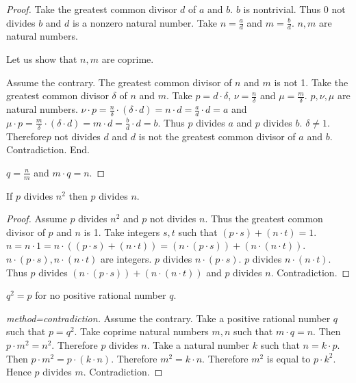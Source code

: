 \documentclass{article}
\begin{document}
\begin{forthel}
\begin{proof}
Take the greatest common divisor $d$ of $a$ and $b$. $b$ is nontrivial. Thus 0 not divides $b$ and $d$ is a nonzero natural number.
Take $n = \frac{a}{d}$ and $m = \frac{b}{d}$. $n,m$ are natural numbers.

Let us show that $n,m$ are coprime.

  Assume the contrary. The greatest common divisor of $n$ and $m$ is not 1. Take the greatest common divisor $\delta$ of $n$ and $m$.
  Take $p = d \cdot \delta$, $\nu = \frac{n}{\delta}$ and $\mu = \frac{m}{\delta}$. $p,\nu,\mu$ are natural numbers.
  $\nu \cdot p = \frac{n}{\delta} \cdot (\delta \cdot d) = n \cdot d = \frac{a}{d} \cdot d = a$ and
  $\mu \cdot p = \frac{m}{\delta} \cdot (\delta \cdot d) = m \cdot d = \frac{b}{d} \cdot d = b$.
  Thus $p$ divides $a$ and $p$ divides $b$. $\delta \neq 1$.
  Therefore$p$ not divides $d$ and $d$ is not the greatest common divisor of $a$ and $b$. Contradiction.
End.

$q = \frac{n}{m}$ and $m \cdot q = n$.
\end{proof}

    \begin{lemma}
      If $p$ divides $n^{2}$ then $p$ divides $n$.
    \end{lemma}
    \begin{proof}
      Assume $p$ divides $n^{2}$ and $p$ not divides $n$. Thus the greatest common divisor of $p$ and $n$ is 1.
      Take integers $s,t$ such that $(p \cdot s) + (n \cdot t) = 1$.
      $n = n \cdot 1 = n \cdot ((p \cdot s) + (n \cdot t)) = (n \cdot (p \cdot s)) + (n \cdot (n \cdot t))$.
      $n \cdot (p \cdot s), n \cdot (n \cdot t)$ are integers.
      $p$ divides $n \cdot (p \cdot s)$. $p$ divides $n \cdot (n \cdot t)$.
      Thus $p$ divides $(n \cdot (p \cdot s)) + (n \cdot (n \cdot t))$ and $p$ divides $n$. Contradiction.
    \end{proof}


    \begin{theorem}[title=Pythagoras]
      $q^{2} = p$ for no positive rational number $q$.
    \end{theorem}
    \begin{proof}[method=contradiction]
      Assume the contrary.
      Take a positive rational number $q$ such that $p = q^{2}$.
      Take coprime natural numbers $m,n$ such that $m \cdot q = n$.
      Then $p \cdot m^{2} = n^{2}$.
      Therefore $p$ divides $n$.
      Take a natural number $k$ such that $n = k \cdot p$.
      Then $p \cdot m^{2} = p \cdot (k \cdot n)$.
      Therefore $m^{2} = k \cdot n$.
      Therefore $m^{2}$ is equal to $p \cdot k^{2}$.
      Hence $p$ divides $m$.
      Contradiction.
    \end{proof}
  \end{forthel}
\end{document}
